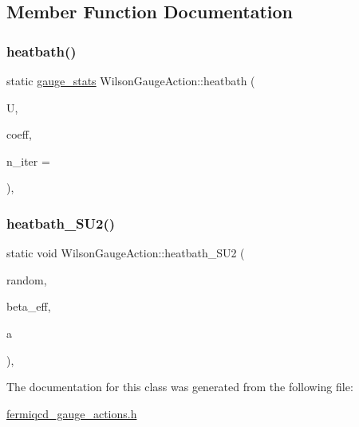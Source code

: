 \subsection{Member Function Documentation}
\mbox{\label{class_wilson_gauge_action_a0e5aefe5e3c15f35d0fbcd8e6269b919}} 
\subsubsection{\texorpdfstring{heatbath()}{heatbath()}}
{\footnotesize\ttfamily static \hyperlink{classgauge__stats}{gauge\+\_\+stats} Wilson\+Gauge\+Action\+::heatbath (\begin{DoxyParamCaption}\item[{\hyperlink{classgauge__field}{gauge\+\_\+field} \&}]{U,  }\item[{\hyperlink{classcoefficients}{coefficients} \&}]{coeff,  }\item[{int}]{n\+\_\+iter = {} }\end{DoxyParamCaption})\hspace{0.3cm}{\ttfamily [inline]}, {\ttfamily [static]}}

\mbox{\label{class_wilson_gauge_action_a95c910d9c558320e8a55ff04f330d02d}} 
\subsubsection{\texorpdfstring{heatbath\+\_\+\+S\+U2()}{heatbath\_SU2()}}
{\footnotesize\ttfamily static void Wilson\+Gauge\+Action\+::heatbath\+\_\+\+S\+U2 (\begin{DoxyParamCaption}\item[{\hyperlink{classmdp__prng}{mdp\+\_\+prng} \&}]{random,  }\item[{\hyperlink{mdp__global__vars_8h_a69d96b74c791e0bbdb888b3913a69450}{mdp\+\_\+real}}]{beta\+\_\+eff,  }\item[{\hyperlink{classmdp__complex}{mdp\+\_\+complex} $\ast$}]{a }\end{DoxyParamCaption})\hspace{0.3cm}{\ttfamily [inline]}, {\ttfamily [static]}}



The documentation for this class was generated from the following file\+:\begin{DoxyCompactItemize}
\item 
\hyperlink{fermiqcd__gauge__actions_8h}{fermiqcd\+\_\+gauge\+\_\+actions.\+h}\end{DoxyCompactItemize}
